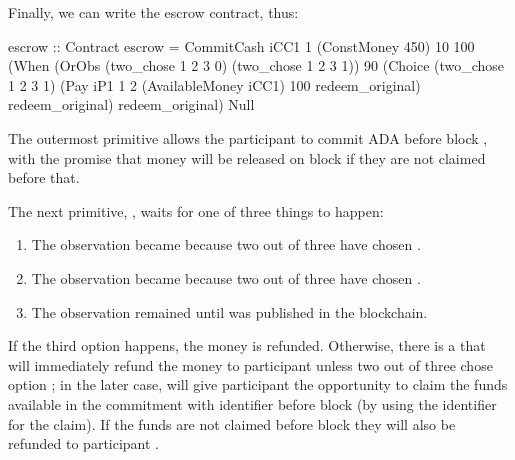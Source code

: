 \documentclass[runningheads]{llncs}
\begin{document}
Finally, we can write the escrow contract, thus:
\begin{haskellcode}
escrow :: Contract
escrow = CommitCash iCC1 1 (ConstMoney 450) 10 100
                    (When (OrObs (two_chose 1 2 3 0)
                                 (two_chose 1 2 3 1))
                          90
                          (Choice (two_chose 1 2 3 1)
                                  (Pay iP1 1 2 (AvailableMoney iCC1) 100
                                       redeem_original)
                                  redeem_original)
                          redeem_original)
                    Null
\end{haskellcode}

The outermost primitive  allows the participant  to commit 
 ADA before block , with the promise that money will be released on block 
 if they are not claimed before that.

The next primitive, , waits for one of three things to happen:
\begin{enumerate}
	\item The observation became  because two out of three have chosen . 
	\item The observation became  because two out of three have chosen .
	\item The observation remained  until  was published in the blockchain.
\end{enumerate}

If the third option happens, the money is refunded. Otherwise, there is a  that will 
immediately refund the money to participant  unless two out of three chose option ; 
in the later case,  will give participant  the opportunity to claim the funds 
available in the commitment with identifier  before block  (by using the 
identifier  for the claim). If the funds are not claimed before block  they will 
also be refunded to participant .
\end{document}
